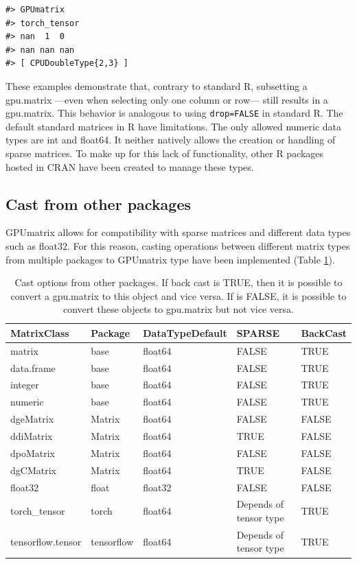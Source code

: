 \begin{verbatim}
#> GPUmatrix
#> torch_tensor
#> nan  1  0
#> nan nan nan
#> [ CPUDoubleType{2,3} ]
\end{verbatim}

These examples demonstrate that, contrary to standard R, subsetting a gpu.matrix ---even when selecting only one column or row--- still results in a gpu.matrix. This behavior is analogous to using \texttt{drop=FALSE} in standard R. The default standard matrices in R have limitations. The only allowed numeric data types are int and float64. It neither natively allows the creation or handling of sparse matrices. To make up for this lack of functionality, other R packages hosted in CRAN have been created to manage these types.

\hypertarget{cast-from-other-packages}{%
\subsection{Cast from other packages}\label{cast-from-other-packages}}

GPUmatrix allows for compatibility with sparse matrices and different data types such as float32. For this reason, casting operations between different matrix types from multiple packages to GPUmatrix type have been implemented (Table \ref{tab:cast-packages-latex}).

\begin{table}

\caption{\label{tab:cast-packages-latex}Cast options from other packages. If back cast is TRUE, then it is possible to convert a gpu.matrix to this object and vice versa. If is FALSE, it is possible to convert these objects to gpu.matrix but not vice versa.}
\centering
\begin{tabular}[t]{l|l|l|l|l}
\hline
MatrixClass & Package & DataTypeDefault & SPARSE & BackCast\\
\hline
matrix & base & float64 & FALSE & TRUE\\
\hline
data.frame & base & float64 & FALSE & TRUE\\
\hline
integer & base & float64 & FALSE & TRUE\\
\hline
numeric & base & float64 & FALSE & TRUE\\
\hline
dgeMatrix & Matrix & float64 & FALSE & FALSE\\
\hline
ddiMatrix & Matrix & float64 & TRUE & FALSE\\
\hline
dpoMatrix & Matrix & float64 & FALSE & FALSE\\
\hline
dgCMatrix & Matrix & float64 & TRUE & FALSE\\
\hline
float32 & float & float32 & FALSE & FALSE\\
\hline
torch\_tensor & torch & float64 & Depends of tensor type & TRUE\\
\hline
tensorflow.tensor & tensorflow & float64 & Depends of tensor type & TRUE\\
\hline
\end{tabular}
\end{table}

